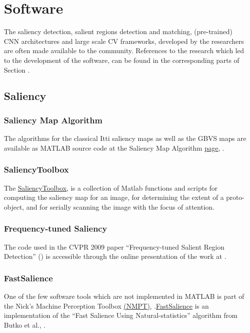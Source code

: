 \section{Software}
\label{sec:soft}
 
The saliency detection, salient regions detection and matching, (pre-trained) CNN architectures and large scale CV frameworks, developed by the researchers are often made available to the community. References to the research which led to the  development of the software, can be found in the corresponding parts of Section .

\subsection{Saliency}

\subsubsection{Saliency Map Algorithm} \label{subsec:salmap}
The algorithms for the classical Itti  \cite{Itti_Koch01nrn} saliency maps as well as the GBVS maps \cite{Harel07graph-basedvisual} are available as MATLAB source code at the Saliency Map Algorithm 
\href{http://www.vision.caltech.edu/~harel/share/gbvs.php}{\underline{page}}, \cite{salmap_soft}.

\subsubsection{SaliencyToolbox}\label{subsec:saltool}
The \href{http://saliencytoolbox.net/index.html}{\underline{SaliencyToolbox}}, \cite{saltool_soft} is a collection of Matlab functions and scripts for computing the saliency map for an image, for determining the extent of a proto-object, and for serially scanning the image with the focus of attention. 

\subsubsection{Frequency-tuned Saliency}\label{subsec:freqsal}
The code used in the CVPR 2009 paper ``Frequency-tuned Salient Region Detection'' (\cite{LCAV-CONF-2009-012}) is accessible through the online presentation of the work at \cite{achantaCVPR09}.

\subsubsection{FastSalience}\label{soft:fastsal:subsec}
One of the few software tools which are not implemented in MATLAB is part of the Nick's Machine Perception Toolbox \href{http://mplab.ucsd.edu/~nick/NMPT/main.html}{\underline{(NMPT)}}, \cite{nmpt_soft}.\href{http://mplab.ucsd.edu/~nick/NMPT/class_fast_salience.html}{\underline{FastSalience}} is an implementation of the ``Fast Salience Using Natural-statistics'' algorithm from Butko et al., \cite{ButkoZCM08}.

